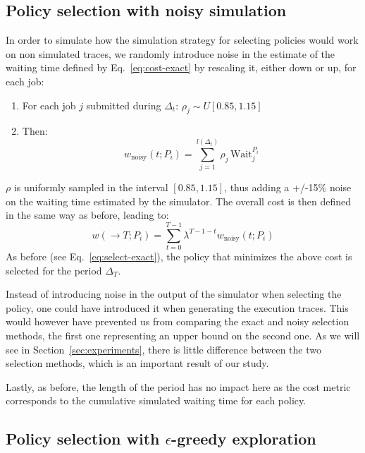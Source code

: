 \documentclass[sigconf]{acmart}
\begin{document}
\subsection{Policy selection with noisy simulation}
\label{sub:noisy}

In order to simulate how the simulation strategy for selecting policies would work on non simulated traces, we randomly introduce noise in the estimate of the waiting time defined by Eq.~\ref{eq:cost-exact} by rescaling it, either down or up, for each job:
%
\begin{enumerate}
\item For each job $j$ submitted during $\Delta_t$: $\rho_j \sim U[0.85,1.15]$
\item Then:
%
\begin{equation}
\label{eq:cost-noisy}
w_{\mbox{noisy}}(t;P_i) = \sum_{j=1}^{l(\Delta_t)} \rho_j \, \mbox{Wait}_j^{P_i}
\end{equation}
%
\end{enumerate}
%
$\rho$ is uniformly sampled in the interval $[0.85,1.15]$, thus adding a +/-15\% noise on the waiting time estimated by the simulator. The overall cost is then defined in the same way as before, leading to:
%
\begin{equation}
\label{eq:tot-cost-noisy}
w(\rightarrow T;P_i) = \sum_{t=0}^{T-1} \lambda^{T-1-t} w_{\mbox{noisy}}(t;P_i)
\end{equation}
%
As before (see Eq.~\ref{eq:select-exact}), the policy that minimizes the above cost is selected for the period $\Delta_T$.

Instead of introducing noise in the output of the simulator when selecting the policy, one could have introduced it when generating the execution traces. This would however have prevented us from comparing the exact and noisy selection methods, the first one representing an upper bound on the second one. As we will see in Section~\ref{sec:experiments}, there is little difference between the two selection methods, which is an important result of our study.

Lastly, as before, the length of the period has no impact here as the cost metric corresponds to the cumulative simulated waiting time for each policy.

\subsection{Policy selection with $\epsilon$-greedy exploration}
\label{sub:bandit}
\end{document}
